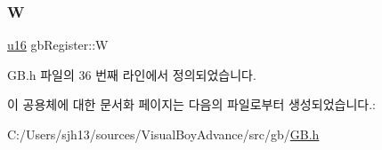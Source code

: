\subsubsection{\texorpdfstring{W}{W}}
{\footnotesize\ttfamily \mbox{\hyperlink{_system_8h_a9e6c91d77e24643b888dbd1a1a590054}{u16}} gb\+Register\+::W}



G\+B.\+h 파일의 36 번째 라인에서 정의되었습니다.



이 공용체에 대한 문서화 페이지는 다음의 파일로부터 생성되었습니다.\+:\begin{DoxyCompactItemize}
\item 
C\+:/\+Users/sjh13/sources/\+Visual\+Boy\+Advance/src/gb/\mbox{\hyperlink{_g_b_8h}{G\+B.\+h}}\end{DoxyCompactItemize}
